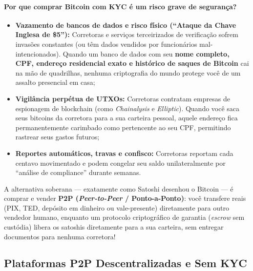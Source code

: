 \documentclass{pousadaguide}
\begin{document}
\paragraph{Por que comprar Bitcoin com KYC é um risco grave de segurança?}
\begin{itemize}
  \item \textbf{Vazamento de bancos de dados e risco físico (“Ataque da Chave Inglesa de \$5”):} Corretoras e serviços terceirizados de verificação sofrem invasões constantes (ou têm dados vendidos por funcionários mal-intencionados). Quando um banco de dados com seu \textbf{nome completo, CPF, endereço residencial exato e histórico de saques de Bitcoin} cai na mão de quadrilhas, nenhuma criptografia do mundo protege você de um assalto presencial em casa;
  \item \textbf{Vigilância perpétua de UTXOs:} Corretoras contratam empresas de espionagem de blockchain (como \emph{Chainalysis} e \emph{Elliptic}). Quando você saca seus bitcoins da corretora para a sua carteira pessoal, aquele endereço fica permanentemente carimbado como pertencente ao seu CPF, permitindo rastrear seus gastos futuros;
  \item \textbf{Reportes automáticos, travas e confisco:} Corretoras reportam cada centavo movimentado e podem congelar seu saldo unilateralmente por ``análise de compliance'' durante semanas.
\end{itemize}

A alternativa soberana — exatamente como Satoshi desenhou o Bitcoin — é comprar e vender \textbf{P2P (\emph{Peer-to-Peer} / Ponto-a-Ponto)}: você transfere reais (PIX, TED, depósito em dinheiro ou vale-presente) diretamente para outro vendedor humano, enquanto um protocolo criptográfico de garantia (\emph{escrow} sem custódia) libera os satoshis diretamente para a sua carteira, sem entregar documentos para nenhuma corretora!

\subsection{Plataformas P2P Descentralizadas e Sem KYC}
\end{document}

